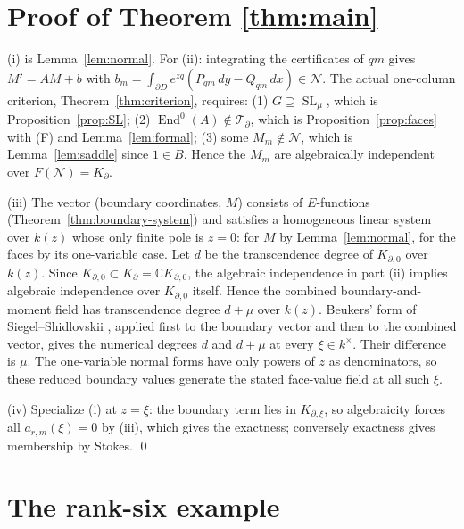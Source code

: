 \documentclass[11pt]{article}
\numberwithin{equation}{section}
\theoremstyle{definition}
\theoremstyle{remark}
\newcommand{\C}{\mathbb C}
\newcommand{\End}{\operatorname{End}}
\newcommand{\SL}{\operatorname{SL}}
\newcommand{\Ncal}{\mathcal N}
\newcommand{\Tcal}{\mathcal T}
\begin{document}
\section{Proof of Theorem \ref{thm:main}}

(i) is Lemma~\ref{lem:normal}. For (ii): integrating the certificates of
$qm$ gives $M'=AM+b$ with $b_m=\int_{\partial D}e^{zq}(P_{qm}\,dy-Q_{qm}\,dx)\in\Ncal$.
The actual one-column criterion, Theorem~\ref{thm:criterion}, requires:
(1) $G\supseteq\SL_\mu$, which is Proposition~\ref{prop:SL};
(2) $\End^0(A)\notin\Tcal_\partial$, which is Proposition~\ref{prop:faces}
with (F) and Lemma~\ref{lem:formal};
(3) some $M_m\notin\Ncal$, which is Lemma~\ref{lem:saddle} since $1\in B$.
Hence the $M_m$ are algebraically independent over $F(\Ncal)=K_\partial$.

(iii) The vector (boundary coordinates, $M$) consists of $E$-functions
(Theorem~\ref{thm:boundary-system}) and satisfies a homogeneous linear system over $k(z)$
whose only finite pole is $z=0$: for $M$ by Lemma~\ref{lem:normal}, for the
faces by its one-variable case. Let $d$ be the transcendence degree of
$K_{\partial,0}$ over $k(z)$.  Since
$K_{\partial,0}\subset K_\partial=\C K_{\partial,0}$, the algebraic
independence in part (ii) implies algebraic independence over
$K_{\partial,0}$ itself.  Hence the combined boundary-and-moment field
has transcendence degree $d+\mu$ over $k(z)$. Beukers' form of Siegel--Shidlovskii
\cite[Theorem~1.1, p.~370]{Beukers}, applied first to the boundary vector
and then to the combined vector, gives the numerical degrees $d$ and
$d+\mu$ at every $\xi\in k^\times$. Their difference is $\mu$.
The one-variable normal forms have only powers of $z$ as denominators, so
these reduced boundary values generate the stated face-value field at
all such $\xi$.

(iv) Specialize (i) at $z=\xi$: the boundary term lies in $K_{\partial,\xi}$,
so algebraicity forces all $a_{r,m}(\xi)=0$ by (iii), which gives the exactness;
conversely exactness gives membership by Stokes. \qed

\section{The rank-six example}\label{sec:example}
\end{document}
